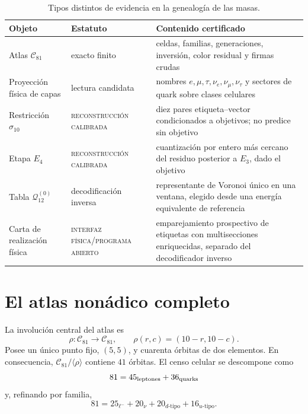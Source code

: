 \begin{table}[htbp]
\centering
\small
\begin{tabularx}{\textwidth}{@{}
>{\raggedright\arraybackslash}p{}
>{\raggedright\arraybackslash}p{}
>{\raggedright\arraybackslash}X@{}}
\toprule
Objeto & Estatuto & Contenido certificado\\
\midrule
Atlas \(\mathcal C_{81}\) & exacto finito & celdas, familias, generaciones,
inversión, color residual y firmas crudas\\
Proyección física de capas & lectura candidata & nombres \(e,\mu,\tau,
\nu_e,\nu_\mu,\nu_\tau\) y sectores de quark sobre clases celulares\\
Restricción \(\widehat\sigma_{10}\) & \textsc{reconstrucción calibrada} & diez pares
etiqueta--vector condicionados a objetivos; no predice sin objetivo\\
Etapa \(E_4\) & \textsc{reconstrucción calibrada} & cuantización por entero más cercano
del residuo posterior a \(E_3\), dado el objetivo\\
Tabla \(\mathcal Q_{12}^{(0)}\) & decodificación inversa & representante de
Voronoi único en una ventana, elegido desde una energía equivalente de referencia\\
Carta de realización física & \textsc{interfaz física}/\textsc{programa abierto} & emparejamiento
prospectivo de etiquetas con multisecciones enriquecidas, separado del
decodificador inverso\\
\bottomrule
\end{tabularx}
\caption{Tipos distintos de evidencia en la genealogía de las masas.}
\label{tab:estatutos-atlas-masas}
\end{table}

\section{El atlas nonádico completo}

La involución central del atlas es
\[
 \rho:\mathcal C_{81}\longrightarrow\mathcal C_{81},
 \qquad \rho(r,c)=(10-r,10-c).
\]
Posee un único punto fijo, \((5,5)\), y cuarenta órbitas de dos elementos. En
consecuencia, \(\mathcal C_{81}/\langle\rho\rangle\) contiene \(41\) órbitas.
El censo celular se descompone como
\[
 81=45_{\rm leptones}+36_{\rm quarks}
\]
y, refinando por familia,
\[
 81=25_{\ell^-}+20_{\nu}+20_{d\text{-tipo}}+16_{u\text{-tipo}}.
\]

